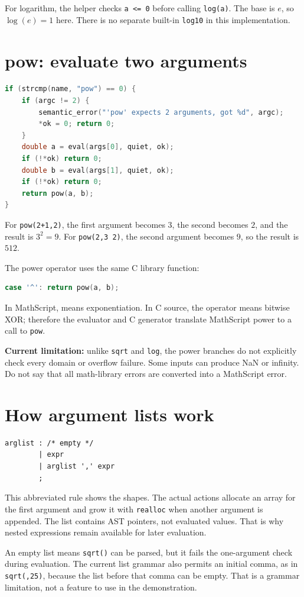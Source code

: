 \documentclass[11pt,a4paper]{report}
\begin{document}
For logarithm, the helper checks \texttt{a <= 0} before calling \texttt{log(a)}.
The base is $e$, so $\log(e)=1$ here. There is no separate built-in
\texttt{log10} in this implementation.

\section{pow: evaluate two arguments}
\begin{lstlisting}[language=C]
if (strcmp(name, "pow") == 0) {
    if (argc != 2) {
        semantic_error("'pow' expects 2 arguments, got %d", argc);
        *ok = 0; return 0;
    }
    double a = eval(args[0], quiet, ok);
    if (!*ok) return 0;
    double b = eval(args[1], quiet, ok);
    if (!*ok) return 0;
    return pow(a, b);
}
\end{lstlisting}
For \texttt{pow(2+1,2)}, the first argument becomes $3$, the second becomes
$2$, and the result is $3^2=9$. For \texttt{pow(2,3 2)}, the second
argument becomes $9$, so the result is $512$.

The power operator uses the same C library function:
\begin{lstlisting}[language=C]
case '^': return pow(a, b);
\end{lstlisting}
In MathScript, \texttt{} means exponentiation. In C source, the
\texttt{} operator means bitwise XOR; therefore the evaluator and C
generator translate MathScript power to a call to \texttt{pow}.

\textbf{Current limitation:} unlike \texttt{sqrt} and \texttt{log}, the power
branches do not explicitly check every domain or overflow failure. Some
inputs can produce NaN or infinity. Do not say that all math-library errors
are converted into a MathScript error.

\section{How argument lists work}
\begin{lstlisting}
arglist : /* empty */
        | expr
        | arglist ',' expr
        ;
\end{lstlisting}
This abbreviated rule shows the shapes. The actual actions allocate an
array for the first argument and grow it with \texttt{realloc} when another
argument is appended. The list contains AST pointers, not evaluated values.
That is why nested expressions remain available for later evaluation.

An empty list means \texttt{sqrt()} can be parsed, but it fails the one-argument
check during evaluation. The current list grammar also permits an initial
comma, as in \texttt{sqrt(,25)}, because the list before that comma can be
empty. That is a grammar limitation, not a feature to use in the demonstration.
\end{document}
